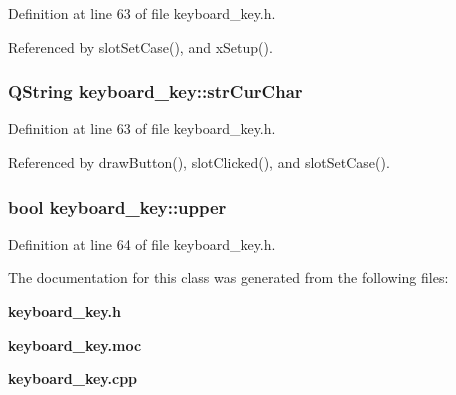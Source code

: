 Definition at line 63 of file keyboard\_\-key.h.

Referenced by slot\-Set\-Case(), and x\-Setup().
\subsubsection{\setlength{\rightskip}{0pt plus 5cm}QString {\bf keyboard\_\-key::str\-Cur\-Char}\hspace{0.3cm}{\tt  [private]}}\label{classkeyboard__key_keyboard__keyr0}




Definition at line 63 of file keyboard\_\-key.h.

Referenced by draw\-Button(), slot\-Clicked(), and slot\-Set\-Case().
\subsubsection{\setlength{\rightskip}{0pt plus 5cm}bool {\bf keyboard\_\-key::upper}\hspace{0.3cm}{\tt  [private]}}\label{classkeyboard__key_keyboard__keyr3}




Definition at line 64 of file keyboard\_\-key.h.

The documentation for this class was generated from the following files:\begin{CompactItemize}
\item 
{\bf keyboard\_\-key.h}\item 
{\bf keyboard\_\-key.moc}\item 
{\bf keyboard\_\-key.cpp}\end{CompactItemize}

